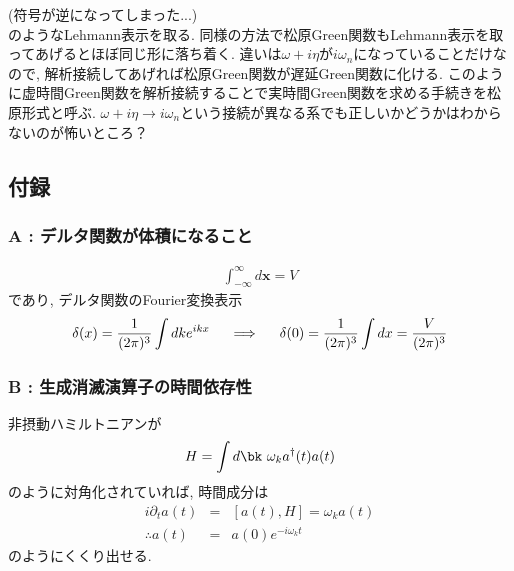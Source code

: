 \documentclass[10.5pt,a4paper]{jreport}
\begin{document}
(符号が逆になってしまった...)\\
のようなLehmann表示を取る. 同様の方法で松原Green関数もLehmann表示を取ってあげるとほぼ同じ形に落ち着く. 違いは$\omega+i\eta$が$i\omega_n$になっていることだけなので, 解析接続してあげれば松原Green関数が遅延Green関数に化ける. このように虚時間Green関数を解析接続することで実時間Green関数を求める手続きを松原形式と呼ぶ. $\omega+i\eta\rightarrow i\omega_n$という接続が異なる系でも正しいかどうかはわからないのが怖いところ？

\subsection{付録}
\subsubsection{A : デルタ関数が体積になること}
\begin{eqnarray}
  \int^\infty_{-\infty} d\bm{x} = V
\end{eqnarray}
であり, デルタ関数のFourier変換表示
\begin{eqnarray}
  \delta(x) = \frac{1}{(2\pi)^3}\int dk e^{ikx}\hspace{0.5cm}\Longrightarrow \hspace{0.5cm}\delta(0) = \frac{1}{(2\pi)^3}\int dx = \frac{V}{(2\pi)^3}
\end{eqnarray}
\subsubsection{B : 生成消滅演算子の時間依存性}
非摂動ハミルトニアンが
\begin{eqnarray}
  H = \int d\bk\ \omega_k a^\dagger(t) a(t)
\end{eqnarray}
のように対角化されていれば, 時間成分は
\begin{eqnarray}
  i\partial_ta(t) &=& [a(t), H] = \omega_k a(t)\\
  \therefore a(t) &=& a(0)e^{-i\omega_k t}
\end{eqnarray}
のようにくくり出せる.
\end{document}
